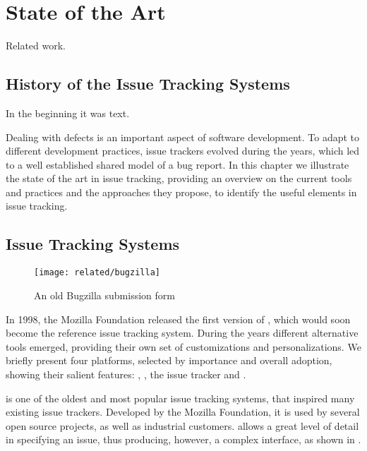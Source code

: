 
\chapter{State of the Art}\label{ch:related}

Related work.

\section{History of the Issue Tracking Systems}

In the beginning it was text.


Dealing with defects is an important aspect of software development. To adapt to different development practices, issue trackers evolved during the years, which led to a well established shared model of a bug report. In this chapter we illustrate the state of the art in issue tracking, providing an overview on the current tools and practices and the approaches they propose, to identify the useful elements in issue tracking.

\section{Issue Tracking Systems}\label{sec:bugtrackers}

\begin{figure}[t]
\centering
  \vspace{-12pt}
  \texttt{[image: related/bugzilla]}
  \caption{An old Bugzilla submission form}
  \label{fig:bugzilla-interface}
\end{figure}

In 1998, the Mozilla Foundation released the first version of \bzilla, which would soon become the reference issue tracking system. During the years different alternative tools emerged, providing their own set of customizations and personalizations. We briefly present four platforms, selected by importance and overall adoption, showing their salient features: \bzilla, \jira, the \gth issue tracker and \fbz.

 \bzilla {} is one of the oldest and most popular issue tracking systems, that inspired many existing issue trackers. Developed by the Mozilla Foundation, it is used by several open source projects, as well as industrial customers. \bzilla allows a great level of detail in specifying an issue, thus producing, however, a complex interface, as shown in .

